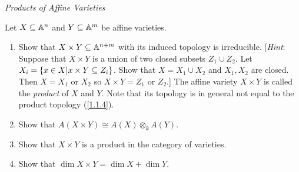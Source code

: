 \label{1.3.15}

\emph{Products of Affine Varieties}

Let $X \subseteq \mathbb A^n$ and $Y \subseteq \mathbb A^m$ be affine varieties.

\begin{enumerate}[label = (\alph*)]
    \item Show that $X \times Y \subseteq \mathbb A^{n + m}$ with its induced topology is irreducible. [\emph{Hint}: Suppose that $X \times Y$ is a union of two closed subsets $Z_1 \cup Z_2$. Let $X_i = {\left\{x \in X | x \times Y \subseteq Z_i\right\}}$. Show that $X = X_1 \cup X_2$ and $X_1, X_2$ are closed. Then $X = X_1$ or $X_2$ so $X \times Y = Z_1$ or $Z_2$.] The affine variety $X \times Y$ is called the \emph{product} of $X$ and $Y$. Note that its topology is in general not equal to the product topology (\ref{1.1.4}).

    \item Show that $A(X \times Y) \cong A(X) \otimes_k A(Y)$.

    \item Show that $X \times Y$ is a product in the category of varieties.

    \item Show that $\dim X \times Y = \dim X + \dim Y$.
\end{enumerate}

